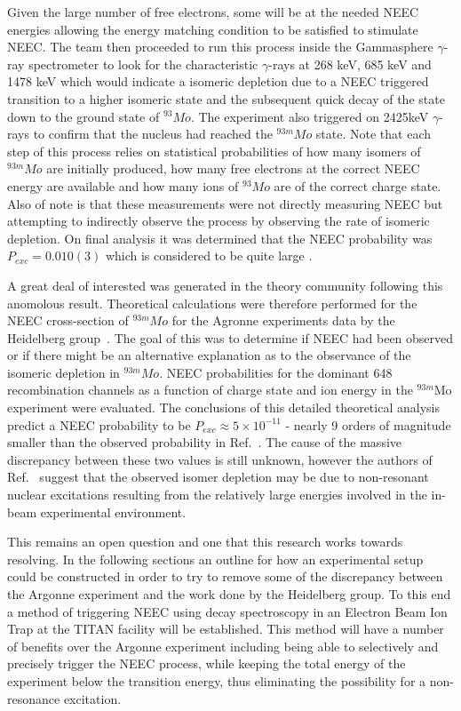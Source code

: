 \documentclass[jon_ringuette_thesis_proposal.tex]{subfiles}
\begin{document}
    Given the large number of free electrons, some will be at the needed NEEC energies allowing the energy matching condition to be satisfied to stimulate NEEC.
    The team then proceeded to run this process inside the Gammasphere $\gamma$-ray spectrometer to look for the characteristic $\gamma$-rays at 268 keV, 685 keV and 1478 keV which would indicate a isomeric depletion due to a NEEC triggered transition to a higher isomeric state and the subsequent quick decay of the state down to the ground state of $^{93}Mo$.
    The experiment also triggered on 2425keV $\gamma$-rays to confirm that the nucleus had reached the $^{93m}Mo$ state.
    Note that each step of this process relies on statistical probabilities of how many isomers of $^{93m}Mo$ are initially produced, how many free electrons at the correct NEEC energy are available and how many ions of $^{93}Mo$ are of the correct charge state.
    Also of note is that these measurements were not directly measuring NEEC but attempting to indirectly observe the process by observing the rate of isomeric depletion.
    On final analysis it was determined that the NEEC probability was $P_{exc} = 0.010(3)$ which is considered to be quite large \cite{Wu2019}.

    A great deal of interested was generated in the theory community following this anomolous result.
    Theoretical calculations were therefore performed for the NEEC cross-section of $^{93m}Mo$ for the Agronne experiments data by the Heidelberg group~\cite{Wu2019}.
    The goal of this was to determine if NEEC had been observed or if there might be an alternative explanation as to the observance of the isomeric depletion in $^{93m}Mo$.
    NEEC probabilities for the dominant 648 recombination channels as a function of charge state and ion energy in the $^{93m}$Mo experiment were evaluated.
    The conclusions of this detailed theoretical analysis predict a NEEC probability to be $P_{exc}\approx 5 \times 10^{-11}$ - nearly 9 orders of magnitude smaller than the observed probability in Ref.~\cite{Chiara2018}.
    The cause of the massive discrepancy between these two values is still unknown, however the authors of Ref.~\cite{Wu2019} suggest that the observed isomer depletion may be due to non-resonant nuclear excitations resulting from the relatively large energies involved in the in-beam experimental environment.

    This remains an open question and one that this research works towards resolving.
    In the following sections an outline for how an experimental setup could be constructed in order to try to remove some of the discrepancy between the Argonne experiment and the work done by the Heidelberg group.
    To this end a method of triggering NEEC using decay spectroscopy in an Electron Beam Ion Trap at the TITAN facility will be established.
    This method will have a number of benefits over the Argonne experiment including being able to selectively and precisely trigger the NEEC process, while keeping the total energy of the experiment below the transition energy, thus eliminating the possibility for a non-resonance excitation.
\end{document}
